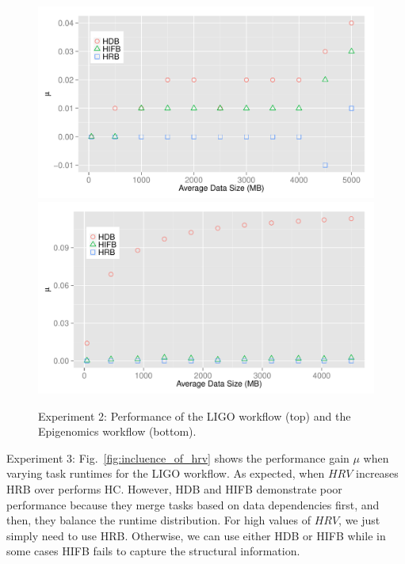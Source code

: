 \documentclass[final,5p,times,twocolumn]{elsarticle}
\begin{document}
\begin{figure}[htb]
	\centering
	\includegraphics[width=\linewidth]{figure/exp2_ligo.pdf}
	\includegraphics[width=\linewidth]{figure/exp2_genome.pdf}
	\caption{Experiment 2: Performance of the LIGO workflow (top) and the Epigenomics workflow (bottom).}
	\label{fig:performance}
	\vspace{-10pt}
\end{figure}

Experiment 3: Fig.~\ref{fig:incluence_of_hrv} shows the performance gain $\mu$ when varying task runtimes for the LIGO workflow. As expected, when $HRV$ increases HRB over performs HC. However, HDB and HIFB demonstrate poor performance because they merge tasks based on data dependencies first, and then, they balance the runtime distribution. 
For high values of $HRV$, we just simply need to use HRB. Otherwise, we can use either HDB or HIFB while in some cases HIFB fails to capture the structural information. 
\end{document}
